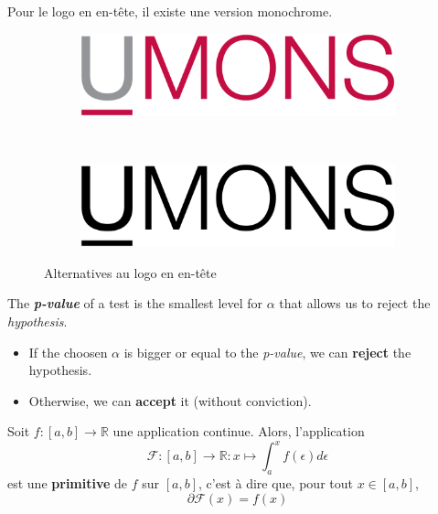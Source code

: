\documentclass{umonsreport}
\begin{document}
Pour le logo en en-tête, il existe une version monochrome.
\begin{figure}[H]
    \centering
    \begin{subfigure}[t]{.4\textwidth}
        \centering
        \includegraphics[width=\textwidth]{logos/small-Umons.png}
    \end{subfigure}
    ~\hspace{3em}
    \begin{subfigure}[t]{.4\textwidth}
        \centering
        \includegraphics[width=\textwidth]{logos/small-Umons-black.png}
    \end{subfigure}
    \caption{Alternatives au logo en en-tête}
    \label{heading-logos}
\end{figure}

\begin{reminder}[p-value]
    The \textbf{\textit{p-value}} of a test is the smallest level for $\alpha$ that allows us to reject the \textit{hypothesis}.
    \begin{itemize} 
        \item If the choosen $\alpha$ is bigger or equal to the \textit{p-value}, we can \textbf{reject} the hypothesis. 
        \item Otherwise, we can \textbf{accept} it (without conviction).
    \end{itemize}
\end{reminder}

\begin{definition}
    Soit $f:[a,b]\to \mathbb R$ une application continue. Alors, l'application
    \[
    \mathcal{F}:[a,b]\to \mathbb R:x\mapsto\int_a^xf(\epsilon)d\epsilon
    \]
    est une \textbf{primitive} de $f$ sur $[a,b]$, c'est \`a dire que, pour tout $x\in[a,b]$,
    \[
    \partial\mathcal{F}(x)=f(x)
    \]
\end{definition}
\end{document}
